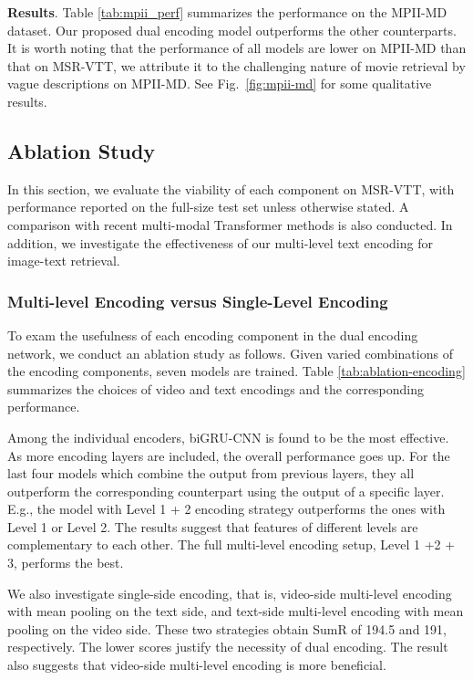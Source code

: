 \textbf{Results}. 
Table \ref{tab:mpii_perf} summarizes the performance on the MPII-MD dataset.
Our proposed dual encoding model outperforms the other counterparts. 
It is worth noting that the performance of all models are lower on MPII-MD than that on MSR-VTT, we attribute it to the challenging nature of movie retrieval by vague descriptions on MPII-MD.
See Fig.~\ref{fig:mpii-md} for some qualitative results.





\subsection{Ablation Study} \label{ssec:ablation}



In this section, we evaluate the viability of each component on MSR-VTT, with performance reported on the full-size test set unless otherwise stated. A comparison with recent multi-modal Transformer methods is also conducted. In addition, we investigate the effectiveness of our multi-level text encoding for image-text retrieval.




\subsubsection{Multi-level Encoding versus Single-Level Encoding}
To exam the usefulness of each encoding component in the dual encoding network, we conduct an ablation study as follows. Given varied combinations of the encoding components, seven models are trained. Table \ref{tab:ablation-encoding} summarizes the choices of video and text encodings and the corresponding performance.

Among the individual encoders, biGRU-CNN is found to be the most effective. 
As more encoding layers are included, the overall performance goes up. For the last four models which combine the output from previous layers, they all outperform the corresponding counterpart using the output of a specific layer. E.g., the model with Level 1 + 2 encoding strategy outperforms the ones with Level 1 or Level 2. The results suggest that features of different levels are complementary to each other. The full multi-level encoding setup, \ie Level 1 +2 + 3, performs the best.


We also investigate single-side encoding, that is, video-side multi-level encoding with mean pooling on the text side, and text-side multi-level encoding with mean pooling on the video side. These two strategies obtain SumR of 194.5 and 191, respectively. The lower scores justify the necessity of dual encoding. The result also suggests that video-side multi-level encoding is more beneficial. 





